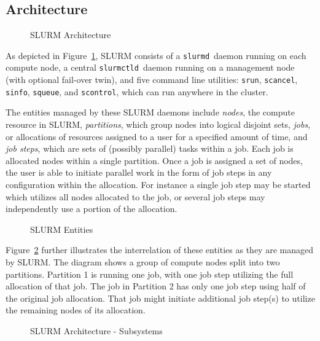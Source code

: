 \documentclass{article}
\newcommand{\slurmctld}{{\tt slurmctld}}
\newcommand{\slurmd}{{\tt slurmd}}
\begin{document}
\subsection{Architecture}

\begin{figure}[tb]
\centerline{}
\caption{SLURM Architecture}
\label{arch}
\end{figure}

As depicted in Figure~\ref{arch}, SLURM consists of a \slurmd\ daemon
running on each compute node, a central \slurmctld\ daemon running on
a management node (with optional fail-over twin), and five command line
utilities: {\tt srun}, {\tt scancel}, {\tt sinfo}, {\tt squeue}, and 
{\tt scontrol}, which can run anywhere in the cluster.  

The entities managed by these SLURM daemons include {\em nodes}, the
compute resource in SLURM, {\em partitions}, which group nodes into
logical disjoint sets, {\em jobs}, or allocations of resources assigned
to a user for a specified amount of time, and {\em job steps}, which are
sets of (possibly parallel) tasks within a job.  
Each job is allocated nodes within a single partition. 
Once a job is assigned a set of nodes, the user is able to initiate
parallel work in the form of job steps in any configuration within the
allocation. For instance a single job step may be started which utilizes
all nodes allocated to the job, or several job steps may independently 
use a portion of the allocation.

\begin{figure}[tcb]
\centerline{}
\caption{SLURM Entities}
\label{entities}
\end{figure}

Figure~\ref{entities} further illustrates the interrelation of these
entities as they are managed by SLURM. The diagram shows a group of
compute nodes split into two partitions. Partition 1 is running one
job, with one job step utilizing the full allocation of that job.
The job in Partition 2 has only one job step using half of the original
job allocation.
That job might initiate additional job step(s) to utilize 
the remaining nodes of its allocation.

\begin{figure}[tb]
\centerline{}
\caption{SLURM Architecture - Subsystems}
\label{archdetail}
\end{figure}
\end{document}
